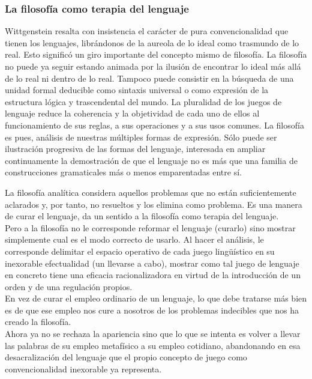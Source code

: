 \documentclass[a4paper, 11pt, twocolumn, spanish]{article}
\begin{document}
\subsubsection{La filosofía como terapia del lenguaje}
\label{sec:orgb3b5581}
Wittgenstein resalta con insistencia el carácter de pura
convencionalidad que tienen los lenguajes, librándonos de la aureola
de lo ideal como trasmundo de lo real. Esto significó un giro
importante del concepto mismo de filosofía. La filosofía no puede ya
seguir estando animada por la ilusión de encontrar lo ideal más allá
de lo real ni dentro de lo real. Tampoco puede consistir en la
búsqueda de una unidad formal deducible como sintaxis universal o como
expresión de la estructura lógica y trascendental del mundo. La
pluralidad de los juegos de lenguaje reduce la coherencia y la
objetividad de cada uno de ellos al funcionamiento de sus reglas, a
sus operaciones y a sus usos comunes. La filosofía es pues, análisis
de nuestras múltiples formas de expresión. Sólo puede ser ilustración
progresiva de las formas del lenguaje, interesada en ampliar
continuamente la demostración de que el lenguaje no es más que una
familia de construcciones gramaticales más o menos emparentadas entre
sí.

La filosofía analítica considera aquellos problemas que no están
suficientemente aclarados y, por tanto, no resueltos y los elimina
como problema. Es una manera de curar el lenguaje, da un sentido a la
filosofía como terapia del lenguaje.\\
Pero a la filosofía no le corresponde reformar el lenguaje (curarlo)
sino mostrar simplemente cual es el modo correcto de usarlo. Al hacer
el análisis, le corresponde delimitar el espacio operativo de cada
juego lingüístico en su inexorable efectualidad (un llevarse a cabo),
mostrar como tal juego de lenguaje en concreto tiene una eficacia
racionalizadora en virtud de la introducción de un orden y de una
regulación propios.\\
En vez de curar el empleo ordinario de un lenguaje, lo que debe
tratarse más bien es de que ese empleo nos cure a nosotros de los
problemas indecibles que nos ha creado la filosofía.\\
Ahora ya no se rechaza la apariencia sino que lo que se intenta es
volver a llevar las palabras de su empleo metafísico a su empleo
cotidiano, abandonando en esa desacralización del lenguaje que el
propio concepto de juego como convencionalidad inexorable ya
representa.
\end{document}
